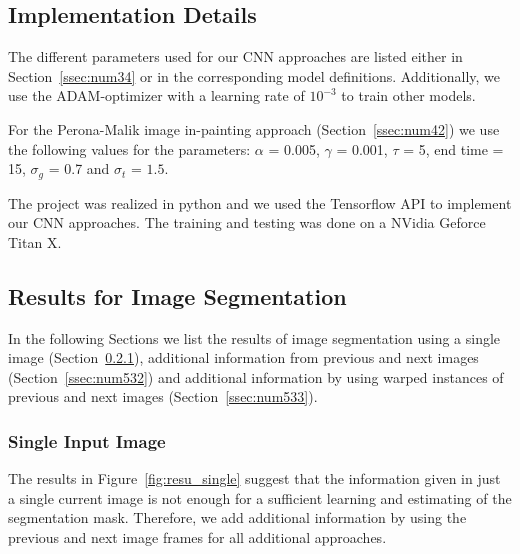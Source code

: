 \subsection{Implementation Details}
\label{ssec:num52}

The different parameters used for our CNN approaches are listed either in Section~\ref{ssec:num34} or in the corresponding model definitions. Additionally, we use the ADAM-optimizer with a learning rate of $10^{-3}$ to train other models.

For the Perona-Malik image in-painting approach (Section~\ref{ssec:num42}) we use the following values for the parameters:
$\alpha$ = 0.005, $\gamma$ = 0.001, $\tau$ = 5, end time = 15, $\sigma_g$ = 0.7 and $\sigma_t$ = $1.5$.

The project was realized in python and we used the Tensorflow API to implement our CNN approaches. The training and testing was done on a NVidia Geforce Titan X.
			

\subsection{Results for Image Segmentation}
\label{ssec:num53}

In the following Sections we list the results of image segmentation using a single image (Section~\ref{ssec:num531}), additional information from previous and next images (Section~\ref{ssec:num532}) and additional information by using warped instances of previous and next images (Section~\ref{ssec:num533}).
\subsubsection{Single Input Image}
\label{ssec:num531}
The results in Figure~\ref{fig:resu_single} suggest that the information given in just a single current image is not enough for a sufficient learning and estimating of the segmentation mask.
Therefore, we add additional information by using the previous and next image frames for all additional approaches.

